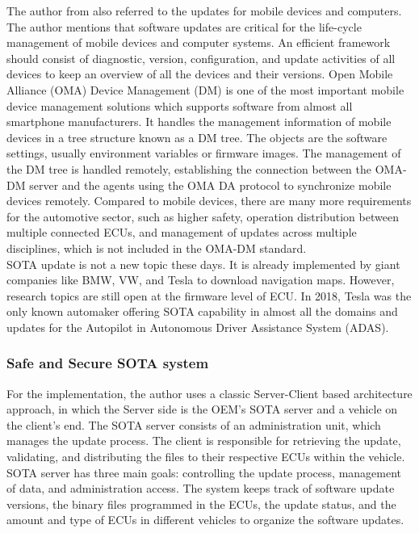 \documentclass[12pt,a4paper]{article}
\begin{document}
The author from \cite{r28} also referred to the updates for mobile devices and computers. The author mentions that software updates are critical for the life-cycle management of mobile devices and computer systems. An efficient framework should consist of diagnostic, version, configuration, and update activities of all devices to keep an overview of all the devices and their versions. Open Mobile Alliance (OMA) Device Management (DM) is one of the most important mobile device management solutions which supports software from almost all smartphone manufacturers. It handles the management information of mobile devices in a tree structure known as a DM tree. The objects are the software settings, usually environment variables or firmware images. The management of the DM tree is handled remotely, establishing the connection between the OMA-DM server and the agents using the OMA DA protocol to synchronize mobile devices remotely. Compared to mobile devices, there are many more requirements for the automotive sector, such as higher safety, operation distribution between multiple connected ECUs, and management of updates across multiple disciplines, which is not included in the OMA-DM standard. \cite{r28} \\

SOTA update is not a new topic these days. It is already implemented by giant companies like BMW, VW, and Tesla to download navigation maps. However, research topics are still open at the firmware level of ECU. In 2018, Tesla was the only known automaker offering SOTA capability in almost all the domains and updates for the Autopilot in Autonomous Driver Assistance System (ADAS). \cite{r28} \\


\subsubsection{Safe and Secure SOTA system}

For the implementation, the author uses a classic Server-Client based architecture approach, in which the Server side is the OEM's SOTA server and a vehicle on the client's end. The SOTA server consists of an administration unit, which manages the update process. The client is responsible for retrieving the update, validating, and distributing the files to their respective ECUs within the vehicle. SOTA server has three main goals: controlling the update process, management of data, and administration access. The system keeps track of software update versions, the binary files programmed in the ECUs, the update status, and the amount and type of ECUs in different vehicles to organize the software updates. \cite{r28} \\
\end{document}
